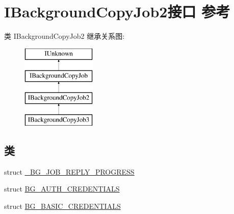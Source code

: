 \hypertarget{interface_i_background_copy_job2}{}\section{I\+Background\+Copy\+Job2接口 参考}
\label{interface_i_background_copy_job2}
类 I\+Background\+Copy\+Job2 继承关系图\+:\begin{figure}[H]
\begin{center}
\leavevmode
\includegraphics[height=4.000000cm]{interface_i_background_copy_job2}
\end{center}
\end{figure}
\subsection*{类}
\begin{DoxyCompactItemize}
\item 
struct \hyperlink{struct_i_background_copy_job2_1_1___b_g___j_o_b___r_e_p_l_y___p_r_o_g_r_e_s_s}{\+\_\+\+B\+G\+\_\+\+J\+O\+B\+\_\+\+R\+E\+P\+L\+Y\+\_\+\+P\+R\+O\+G\+R\+E\+SS}
\item 
struct \hyperlink{struct_i_background_copy_job2_1_1_b_g___a_u_t_h___c_r_e_d_e_n_t_i_a_l_s}{B\+G\+\_\+\+A\+U\+T\+H\+\_\+\+C\+R\+E\+D\+E\+N\+T\+I\+A\+LS}
\item 
struct \hyperlink{struct_i_background_copy_job2_1_1_b_g___b_a_s_i_c___c_r_e_d_e_n_t_i_a_l_s}{B\+G\+\_\+\+B\+A\+S\+I\+C\+\_\+\+C\+R\+E\+D\+E\+N\+T\+I\+A\+LS}
\end{DoxyCompactItemize}
